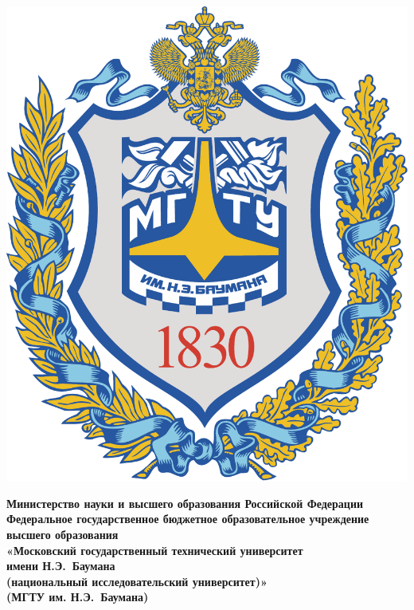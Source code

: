 \begin{titlepage}
	\noindent
    \begin{minipage}{0.15\textwidth}
        \includegraphics[width=\linewidth]{../data/bmstu-logo.pdf}
	\end{minipage}
	\fontsize{12pt}{12pt}\selectfont
	\noindent
    \begin{minipage}{0.85\textwidth}\centering
        \linespread{1.1}\selectfont
        \textbf{Министерство науки и высшего образования Российской
                Федерации}\\
        \textbf{Федеральное государственное бюджетное образовательное
                учреждение высшего образования}\\
        \textbf{«Московский государственный технический университет~\\имени
                Н.Э.~Баумана}\\
        \textbf{(национальный исследовательский университет)»}\\
        \textbf{(МГТУ им. Н.Э.~Баумана)}
	\end{minipage}
    \begin{spacing}{0.2}
        ~\\
    \end{spacing}


\end{titlepage}
